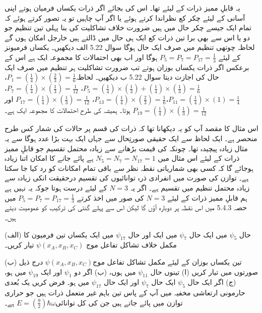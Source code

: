 یہ قابلِ ممیز ذرات کے لیئے تھا۔ اس کی بجائے اگر ذرات یکساں فرمیان ہوتے اپنی آسانی کے لیئے چکر کع نظراندا کرتے ہوئے یا اگر آپ چاہیں تو یہ تصور کرتے ہوئے کہ تمام ایک جیسے چکر حال میں ہیں ضرورت خلاف تشاکلیت کی بنا پہلی تین تنظیم جو دو یا اس سے بھی برا تین ذرات کع ایک ہی حال میں ڈالتے ہیں خارجل امکان ہوں گے لحاظہ چوتھی تنظیم میں صرف ایک حال ہوگا سوال \num{5.22} الف دیکھیں۔ یکساں فرمیونز کے لیئے \(P_5 = P_7 = P_{17} = \frac{1}{3}\) ہوگا اور اب بھی احتمالات کا مجموعہ ایک ہے اس کے برعکس اگر ذرات یکساں بوزان ہوتے تب ضرورت تشاکلیت ہر تنظیم میں صرف ایک حال کی اجازت دیتا سوال \num{5.22} ب دیکھیں۔ لحاظہ\(P_1 = (\frac{1}{4})\times(\frac{2}{3}) = \frac{1}{6}\)، \(P_5 = (\frac{1}{4})\times(\frac{1}{3}) + (\frac{1}{4})\times(\frac{1}{3}) = \frac{1}{6}\)، \(P_7 = (\frac{1}{4})\times(\frac{1}{3}) = \frac{1}{12}\)، \(P_{11} = (\frac{1}{4})\times(1) = \frac{1}{4}\)،\(P_{13} = (\frac{1}{4})\times(\frac{2}{3}) = \frac{1}{6}\)، \(P_{17} = (\frac{1}{4})\times(\frac{1}{3}) = \frac{1}{12}\) اور \(P_{19} = (\frac{1}{4})\times(\frac{1}{3}) = \frac{1}{12}\) ہوتا۔ ہمیشہ کی طرح احتمالات کا مجموعہ ایک ہے۔

اس مثال کا مقصد آپ کو یہ دیکھانا تھا کہ ذرات کی قسم پر حالات کی شمار کس طرح منحصر ہے۔ ایک لحاظ سے ایک حقیقی صورتِحال سے جہاں  ایک بہت بڑا عدد ہوگا سے یہ مثال زیادہ پیچیدہ تھا۔ چونکہ  کی قیمت بڑھانے سے زیادہ محتمل تقسیم جو قابلِ ممیز ذرات کے لیئے اس مثال میں \(N_5 = N_7 = N_{17} = 1\) ہے پائے جانے کا امکان اتنا زیادہ ہوجائے گا کہ کسی بھی شماریاتی نقطہ نظر سے باقی تمام امکانات کو رد کیا جا سکتا ہے۔ توازن کی صورت میں انفرادی ذرہ توانائیوں کی تقسیم درحقیقت انکی زیادہ سے زیادہ محتمل تنظیم میں تقسیم ہے۔ اگر یہ \(N = 3\)  کے لیئے درست ہوتا جوکہ یہ نہیں ہے ہم قابلِ ممیز ذرات کے لیئے \(N = 3\) کی صور میں اخذ کرتے \(P_5 = P_7 = P_{17} = \frac{1}{3}\) میں حصہ 5.4.3 میں اس نقطہ پر دوبارہ آؤں گا لیکن اس سے پہلے گنتی کی ترکیب کو عمومیت دیتے ہیں۔


(الف) حال \(\psi_5\) میں ایک حال \(\psi_7\) میں ایک اور حال \(\psi_{17}\) میں ایک یکساں تین فرمیون کا مکمل خلاف تشاکل تفاعل موج \(\psi(x_A, x_B, x_C)\) تیار کریں۔

(ب) تین یکساں بوزان کے لیئے مکمل تشاکل تفاعل موج\(\psi(x_A, x_B, x_C)\) درج ذیل صورتوں میں تیار کریں (ا) تینوں حال \(\psi_{11}\) میں ہوں، (ب) اگر دو \(\psi_1\) اور ایک \(\psi_{19}\) میں ہو، (ج) اگر ایک حال \(\psi_5\) ایک حال \(\psi_7\) اور ایک حال \(\psi_{17}\) میں ہو۔ 
فرض کریں یک بُعدی حارمونی ارتعاشی مخفیہ میں آپ کے پاس تین باہم غیر متعمل ذرات ہیں جو حراری توازن میں پائے جاتے ہیں جن کی کل توانائی\(E = (\frac{9}{2})\hbar\omega\) ہے۔

